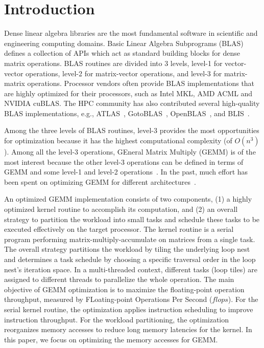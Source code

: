 \section{Introduction}\label{sec:intro}
Dense linear algebra libraries are the most fundamental software in
scientific and engineering computing domains.
Basic Linear Algebra Subprograms (BLAS)~\cite{blas}  defines a collection
of APIs which act as standard building blocks for dense matrix operations.
BLAS routines are divided into 3 levels,
level-1 for vector-vector operations,
level-2 for matrix-vector operations,
and level-3 for matrix-matrix operations.
Processor vendors often provide BLAS implementations
that are highly optimized for their processors,
such as Intel MKL, AMD ACML and NVIDIA cuBLAS.
The HPC community has also contributed several high-quality
BLAS implementations, e.g., ATLAS~\cite{atlas},
GotoBLAS~\cite{gotoblas}, OpenBLAS~\cite{openblas},
and BLIS~\cite{blis,blisport}.

Among the three levels of BLAS routines, level-3 provides the most opportunities
for optimization because it has the highest computational complexity (of $O(n^3)$).
Among all the level-3 operations, GEneral Matrix Multiply (GEMM) is
of the most interest because the 
other level-3 operations can be defined
in terms of GEMM and some level-1 and level-2 operations~\cite{gemmbased1}.
In the past, much effort has been spent on optimizing GEMM for different
architectures~\cite{Liu2012,Wang2015,Volkov:2008,Cui11,blispar}.

An optimized GEMM implementation consists of two components,
(1) a highly optimized kernel routine to accomplish its
computation, and
(2) an overall strategy to partition the workload into small tasks
and schedule these tasks to be executed effectively on the target processor.
The kernel routine is a serial program performing matrix-multiply-accumulate
on matrices from a single task.
The overall strategy partitions the workload by tiling 
the underlying loop nest
and determines a task schedule by choosing a specific traversal order
in the loop nest's iteration space.
In a multi-threaded context, different tasks (loop tiles) are assigned to
different threads to parallelize the whole operation.
The main objective of GEMM optimization is to
maximize the floating-point
operation throughput, measured by FLoating-point Operations Per Second ($flops$).
For the serial kernel routine, the optimization applies
instruction scheduling to improve instruction throughput.
For the workload partitioning, the optimization 
reorganizes memory accesses to reduce long memory latencies for
the kernel.
In this paper, we focus on optimizing the memory accesses for GEMM.

